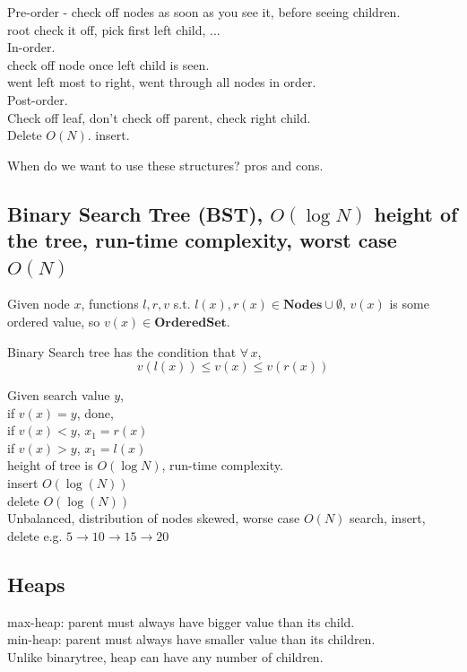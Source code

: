 \documentclass[10pt]{amsart}
\begin{document}
\begin{multicols*}{2}
Pre-order - check off nodes as soon as you see it, before seeing children. \\
root check it off, pick first left child, ... \\

In-order. \\
check off node once left child is seen. \\
went left most to right, went through all nodes in order. \\

Post-order. \\
Check off leaf, don't check off parent, check right child. \\

Delete $O(N)$.
insert.

When do we want to use these structures? pros and cons.

\subsection{Binary Search Tree (BST), $O(\log{N})$ height of the tree, run-time complexity, worst case $O(N)$}

Given node $x$, functions $l, r, v$ s.t. $l(x), r(x) \in \textbf{Nodes} \cup \emptyset$, $v(x)$ is some ordered value, so $v(x) \in \textbf{OrderedSet}$. 

Binary Search tree has the condition that $\forall \, x$, 
\[
v(l(x)) \leq v(x) \leq v(r(x))
\]

Given search value $y$, \\
if $v(x) = y$, done, \\
if $v(x) < y$, $x_1 = r(x)$ \\
if $v(x) > y$, $x_1= l(x)$ \\

height of tree is $O(\log{N})$, run-time complexity. \\
insert $O(\log{(N)})$ \\
delete $O(\log{(N)})$ \\

Unbalanced, distribution of nodes skewed, worse case $O(N)$ search, insert, delete e.g. $5 \to 10 \to 15 \to 20$

\subsection{Heaps}

max-heap: parent must always have bigger value than its child. \\
min-heap: parent must always have smaller value than its children. \\
Unlike binarytree, heap can have any number of children. 


\end{multicols*}
\end{document}
